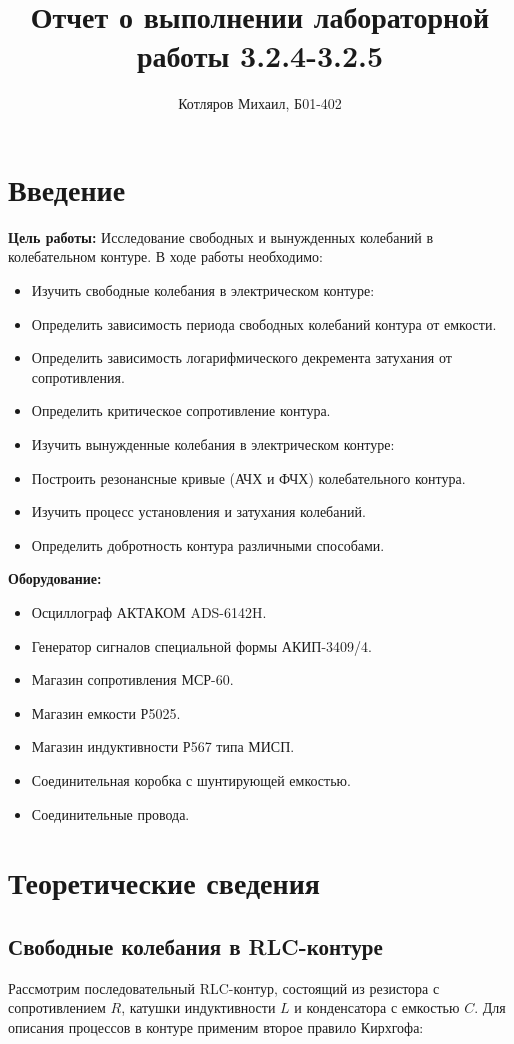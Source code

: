 \documentclass[a4paper]{article}
\title{\textbf{Отчет о выполнении лабораторной работы 3.2.4-3.2.5}}
\date{}
\author{Котляров Михаил, Б01-402}
\begin{document}
\maketitle
	
	\section{Введение}
	
	\textbf{Цель работы:} Исследование свободных и вынужденных колебаний в колебательном контуре. В ходе работы необходимо:\\
\begin{itemize}
\item Изучить свободные колебания в электрическом контуре:
        \item Определить зависимость периода свободных колебаний контура от емкости.
        \item Определить зависимость логарифмического декремента затухания от сопротивления.
        \item Определить критическое сопротивление контура.
    \item Изучить вынужденные колебания в электрическом контуре:
    \item Построить резонансные кривые (АЧХ и ФЧХ) колебательного контура.
        \item Изучить процесс установления и затухания колебаний.
    \item Определить добротность контура различными способами.
\end{itemize}

	\textbf{Оборудование:} \begin{itemize}
\item Осциллограф АКТАКОМ ADS-6142H.
    \item Генератор сигналов специальной формы АКИП-3409/4.
    \item Магазин сопротивления МСР-60.
    \item Магазин емкости Р5025.
    \item Магазин индуктивности Р567 типа МИСП.
    \item Соединительная коробка с шунтирующей емкостью.
    \item Соединительные провода.
\end{itemize}
	\section{Теоретические сведения}

\subsection{Свободные колебания в RLC-контуре}
Рассмотрим последовательный RLC-контур, состоящий из резистора с сопротивлением $R$, катушки индуктивности $L$ и конденсатора с емкостью $C$. Для описания процессов в контуре применим второе правило Кирхгофа:
\end{document}
